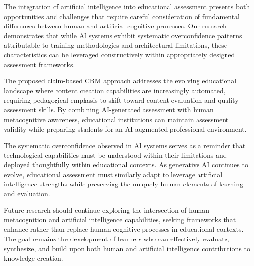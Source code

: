 \documentclass[sigconf]{acmart}
\begin{document}
The integration of artificial intelligence into educational assessment presents both opportunities and challenges that require careful consideration of fundamental differences between human and artificial cognitive processes. Our research demonstrates that while AI systems exhibit systematic overconfidence patterns attributable to training methodologies and architectural limitations, these characteristics can be leveraged constructively within appropriately designed assessment frameworks.

The proposed claim-based CBM approach addresses the evolving educational landscape where content creation capabilities are increasingly automated, requiring pedagogical emphasis to shift toward content evaluation and quality assessment skills. By combining AI-generated assessment with human metacognitive awareness, educational institutions can maintain assessment validity while preparing students for an AI-augmented professional environment.

The systematic overconfidence observed in AI systems serves as a reminder that technological capabilities must be understood within their limitations and deployed thoughtfully within educational contexts. As generative AI continues to evolve, educational assessment must similarly adapt to leverage artificial intelligence strengths while preserving the uniquely human elements of learning and evaluation.

Future research should continue exploring the intersection of human metacognition and artificial intelligence capabilities, seeking frameworks that enhance rather than replace human cognitive processes in educational contexts. The goal remains the development of learners who can effectively evaluate, synthesize, and build upon both human and artificial intelligence contributions to knowledge creation.



\end{document}
